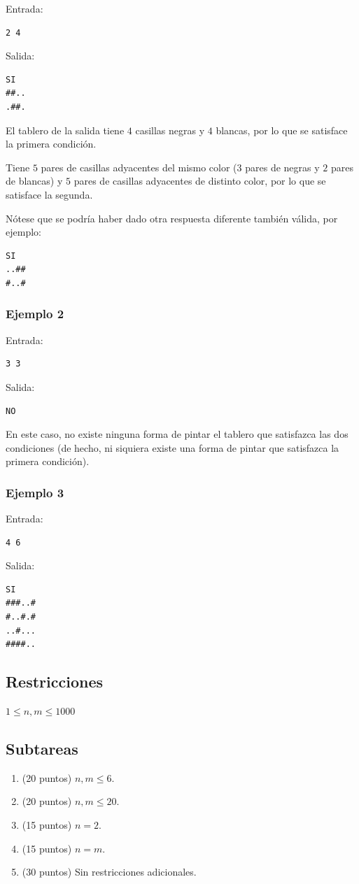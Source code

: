 \documentclass[10.5pt]{article}
\begin{document}
Entrada:
\begin{verbatim}
2 4
\end{verbatim}
Salida:
\begin{verbatim}
SI
##..
.##.
\end{verbatim}

El tablero de la salida tiene $4$ casillas negras y $4$ blancas, por lo que se satisface la primera condici\'on.

Tiene $5$ pares de casillas adyacentes del mismo color ($3$ pares de negras y $2$ pares de blancas) y $5$ pares de casillas adyacentes de distinto color, por lo que se satisface la segunda.

N\'otese que se podr\'ia haber dado otra respuesta diferente tambi\'en v\'alida, por ejemplo:

\begin{verbatim}
SI
..##
#..#
\end{verbatim}

\subsubsection*{Ejemplo 2}
Entrada:
\begin{verbatim}
3 3
\end{verbatim}

Salida:
\begin{verbatim}
NO
\end{verbatim}

En este caso, no existe ninguna forma de pintar el tablero que satisfazca las dos condiciones (de hecho, ni siquiera existe una forma de pintar que satisfazca la primera condici\'on).

\subsubsection*{Ejemplo 3}
Entrada:
\begin{verbatim}
4 6
\end{verbatim}
Salida:
\begin{verbatim}
SI
###..#
#..#.#
..#...
####..
\end{verbatim}

\subsection*{Restricciones}
$1 \leq n, m \leq 1000$
\subsection*{Subtareas}

\begin{enumerate}
    \item (20 puntos) $n, m \leq 6$.
    \item (20 puntos) $n, m \leq 20$.
    \item (15 puntos) $n = 2$.
    \item (15 puntos) $n = m$.
    \item (30 puntos) Sin restricciones adicionales.
\end{enumerate}
\end{document}
